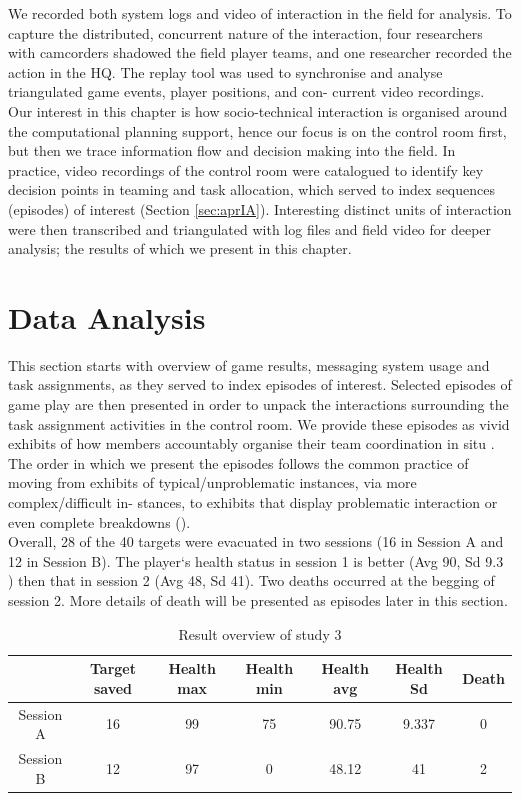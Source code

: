 We recorded both system logs and video of interaction in the field for analysis. To capture the distributed, concurrent nature of the interaction, four researchers with camcorders shadowed the field player teams, and one researcher recorded the action in the HQ. The replay tool was used to synchronise and analyse triangulated game events, player positions, and con- current video recordings.\\

Our interest in this chapter is how socio-technical interaction is organised around the computational planning support, hence our focus is on the control room first, but then we trace information flow and decision making into the field. In practice, video recordings of the control room were catalogued to identify key decision points in teaming and task allocation, which served to index sequences (episodes) of interest (Section \ref{sec:aprIA}). Interesting distinct units of interaction were then transcribed and triangulated with log files and field video for deeper analysis; the results of which we present in this chapter.\\


\section{Data Analysis}
This section starts with overview of game results, messaging system usage and task assignments, as they served to index episodes of interest. Selected episodes of game play are then presented in order to unpack the interactions surrounding the task assignment activities in the control room. We provide these episodes as vivid exhibits of how members accountably organise their team coordination in situ \cite{Crabtree2012}. The order in which we present the episodes follows the common practice of moving from exhibits of typical/unproblematic instances, via more complex/difficult in- stances, to exhibits that display problematic interaction or even complete breakdowns (\cite{Heath2010}).\\

Overall, 28 of the 40 targets were evacuated in two sessions (16 in Session A and 12 in Session B). The player`s health status in session 1 is better  (Avg 90, Sd 9.3 ) then that in session 2 (Avg 48, Sd 41). Two deaths occurred at the begging of session 2. More details of death will be presented as episodes later in this section. \\

\begin{table}[h]
\centering
\footnotesize
\label{my-label}
\begin{tabular}{c|cccccc}
          & Target saved & Health max & Health min & Health avg & Health Sd & Death \\ \hline
Session A & 16           & 99         & 75         & 90.75      & 9.337     & 0     \\
Session B & 12           & 97         & 0          & 48.12      & 41        & 2    
\end{tabular}
\caption{Result overview of study 3}
\label{tab:ResultsOverview}
\end{table}

